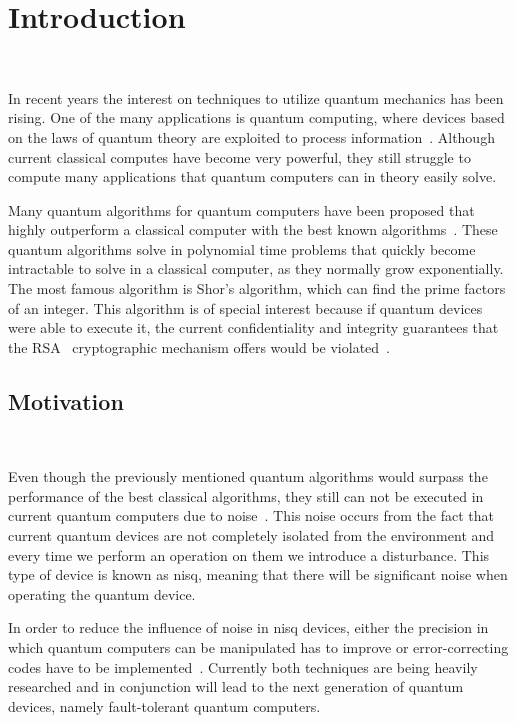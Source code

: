 \chapter{Introduction}\label{chapter:introduction} \

In recent years the interest on techniques to utilize quantum mechanics has been rising.
One of the many applications is quantum computing, where devices based on the laws
of quantum theory are exploited to process information~\cite{national_academies_of_sciences_engineering_and_medicine_quantum_2019}.
Although current classical computes have become very powerful, they still struggle to
compute many applications that quantum computers can in theory easily solve. \

Many quantum algorithms for quantum computers have been proposed that highly
outperform a classical computer with the best known algorithms~\cite{shor_polynomial-time_1997, van_dam_quantum_2006, hallgren_polynomial-time_2007}.
These quantum algorithms solve in polynomial time problems that quickly become
intractable to solve in a classical computer, as they normally grow exponentially.
The most famous algorithm is Shor's algorithm, which can find the prime factors
of an integer. This algorithm is of special interest because if quantum devices
were able to execute it, the current confidentiality and integrity guarantees
that the RSA~\cite{rivest_method_1978} cryptographic mechanism offers would be violated~\cite{shor_polynomial-time_1997}. \

\section{Motivation} \

Even though the previously mentioned quantum algorithms would surpass the performance
of the best classical algorithms, they still can not be executed in current quantum
computers due to noise~\cite{preskill_quantum_2018}. This noise occurs from the fact
that current quantum devices are not completely isolated from the environment and every
time we perform an operation on them we introduce a disturbance. This type of device
is known as \ac{nisq}, meaning that there will be significant noise when operating
the quantum device. \

In order to reduce the influence of noise in \ac{nisq} devices, either the precision
in which quantum computers can be manipulated has to improve or error-correcting
codes have to be implemented~\cite{shor_quantum_nodate}. Currently both techniques are
being heavily researched and in conjunction will lead to the next generation of
quantum devices, namely fault-tolerant quantum computers. \

